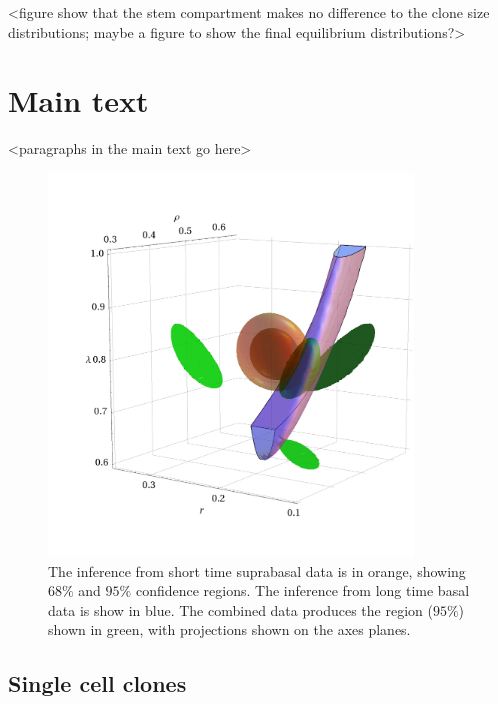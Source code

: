 \documentclass[10pt,UKenglish]{article}
\begin{document}
<figure show that the stem compartment makes no difference to the clone size distributions; maybe a figure to show the final equilibrium distributions?>

\section{Main text}

<paragraphs in the main text go here>

\begin{figure}[htb]
	\centering
	\includegraphics[height=4in]{oes-combined-prior.png}
	\caption{\label{fig:inferences}The inference from short time suprabasal data is in orange, showing $68\%$ and $95\%$ confidence regions. The inference from long time basal data is show in blue. The combined data produces the region ($95\%$) shown in green, with projections shown on the axes planes.}
\end{figure}

\subsection{Single cell clones}
\end{document}
